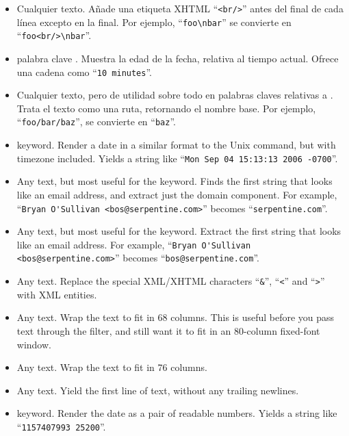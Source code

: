{{\begin{itemize}
\item[\tplfilter{addbreaks}] Cualquier texto. Añade una etiqueta XHTML
  ``\Verb+<br/>+'' antes del final de cada línea excepto en la final.
  Por ejemplo, ``\Verb+foo\nbar+'' se convierte en ``\Verb+foo<br/>\nbar+''.
\item[\tplkwfilt{date}{age}] palabra clave .  Muestra
  la edad de la fecha, relativa al tiempo actual. Ofrece una cadena como
  ``\Verb+10 minutes+''.
\item[\tplfilter{basename}] Cualquier texto, pero de utilidad sobre
  todo en palabras claves relativas a .  Trata el
  texto como una ruta, retornando el nombre base.  Por ejemplo,
  ``\Verb+foo/bar/baz+'', se convierte en ``\Verb+baz+''.
\item[\tplkwfilt{date}{date}]  keyword.  Render a date
  in a similar format to the Unix  command, but with
  timezone included.  Yields a string like
  ``\Verb+Mon Sep 04 15:13:13 2006 -0700+''.
\item[\tplkwfilt{author}{domain}] Any text, but most useful for the
   keyword.  Finds the first string that looks like
  an email address, and extract just the domain component.  For
  example, ``\Verb+Bryan O'Sullivan <bos@serpentine.com>+'' becomes
  ``\Verb+serpentine.com+''.
\item[\tplkwfilt{author}{email}] Any text, but most useful for the
   keyword.  Extract the first string that looks like
  an email address.  For example,
  ``\Verb+Bryan O'Sullivan <bos@serpentine.com>+'' becomes
  ``\Verb+bos@serpentine.com+''.
\item[\tplfilter{escape}] Any text.  Replace the special XML/XHTML
  characters ``\Verb+&+'', ``\Verb+<+'' and ``\Verb+>+'' with
  XML entities.
\item[\tplfilter{fill68}] Any text.  Wrap the text to fit in 68
  columns.  This is useful before you pass text through the
   filter, and still want it to fit in an
  80-column fixed-font window.
\item[\tplfilter{fill76}] Any text.  Wrap the text to fit in 76
  columns.
\item[\tplfilter{firstline}] Any text.  Yield the first line of text,
  without any trailing newlines.
\item[\tplkwfilt{date}{hgdate}]  keyword.  Render the
  date as a pair of readable numbers.  Yields a string like
  ``\Verb+1157407993 25200+''.

\end{itemize}}}
